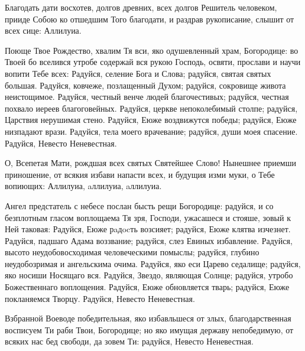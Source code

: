 \begin{mymulticols}

Благодать дати восхотев, долгов древних, всех долгов Решитель человеком, прииде Собою ко отшедшим Того благодати, и раздрав рукописание, слышит от всех сице: Аллилуиа.


Поюще Твое Рождество, хвалим Тя вси, яко одушевленный храм, Богородице: во Твоей бо вселився утробе содержай вся рукою Господь, освяти, прослави и научи вопити Тебе всех: Радуйся, селение Бога и Слова; радуйся, святая святых большая. Радуйся, ковчеже, позлащенный Духом; радуйся, сокровище живота неистощимое. Радуйся, честный венче людей благочестивых; радуйся, честная похвало иереев благоговейных. Радуйся, церкве непоколебимый столпе; радуйся, Царствия нерушимая стено. Радуйся, Еюже воздвижутся победы; радуйся, Еюже низпадают врази. Радуйся, тела моего врачевание; радуйся, души моея спасение. Радуйся, Невесто Неневестная.


О, Всепетая Мати, рождшая всех святых Святейшее Слово! Нынешнее приемши приношение, от всякия избави напасти всех, и будущия изми муки, о Тебе вопиющих: Аллилуиа, aллилуиа, aллилуиа.



Ангел предстатель с небесе послан бысть рещи Богородице: радуйся, и со безплотным гласом воплощаема Тя зря, Господи, ужасашеся и стояше, зовый к Ней таковая: Радуйся, Еюже рaдocть возсияет; радуйся, Еюже клятва изчезнет. Радуйся, падшаго Адама воззвание; радуйся, слез Евиных избавление. Радуйся, высото неудобовосходимая человеческими помыслы; радуйся, глубино неудобозримая и ангельскима очима. Радуйся, яко еси Царево седалище; радуйся, яко носиши Носящаго вся. Радуйся, Звездо, являющая Солнце; радуйся, утробо Божественнаго воплощения. Радуйся, Еюже обновляется тварь; радуйся, Еюже покланяемся Творцу. Радуйся, Невесто Неневестная.


Взбранной Воеводе победительная, яко избавльшеся от злых, благодарственная восписуем Ти раби Твои, Богородице; но яко имущая державу непобедимую, от всяких нас бед свободи, да зовем Ти: радуйся, Невесто Неневестная.



\end{mymulticols}
